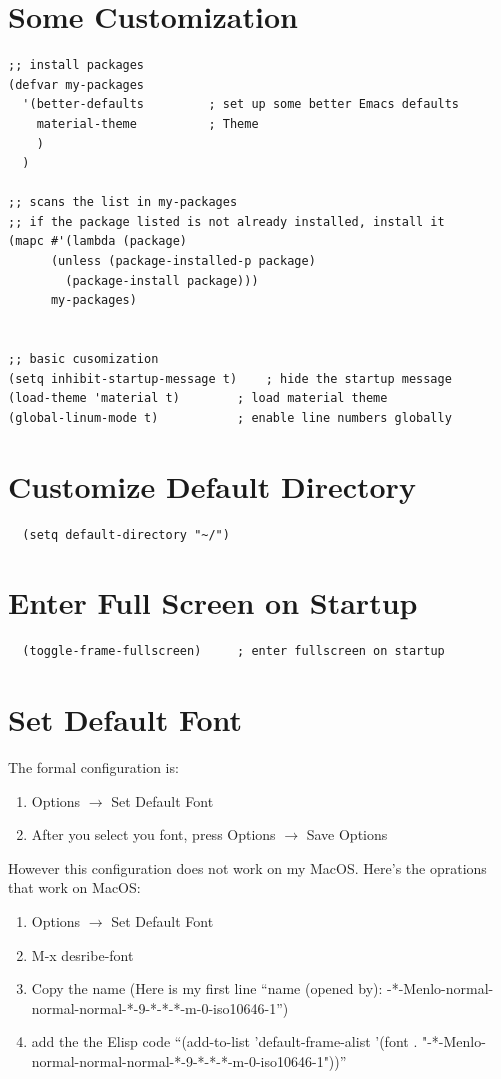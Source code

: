 \section{Some Customization}
\lstset{language=Lisp}
\begin{lstlisting}
;; install packages
(defvar my-packages
  '(better-defaults			; set up some better Emacs defaults
    material-theme			; Theme
    )
  )

;; scans the list in my-packages
;; if the package listed is not already installed, install it
(mapc #'(lambda (package)
	  (unless (package-installed-p package)
	    (package-install package)))
      my-packages)


;; basic cusomization
(setq inhibit-startup-message t)	; hide the startup message
(load-theme 'material t)		; load material theme
(global-linum-mode t)			; enable line numbers globally
\end{lstlisting}


\section{Customize Default Directory}
\lstset{language=Lisp}
\begin{lstlisting}
  (setq default-directory "~/")
\end{lstlisting}


\section{Enter Full Screen on Startup}

\begin{lstlisting}
  (toggle-frame-fullscreen)		; enter fullscreen on startup
\end{lstlisting}


\section{Set Default Font}

The formal configuration is:
\begin{enumerate}
\item Options $\rightarrow$ Set Default Font
\item After you select you font, press Options $\rightarrow$ Save Options
\end{enumerate}


However this configuration does not work on my MacOS.
Here's the oprations that work on MacOS:
\begin{enumerate}
\item Options $\rightarrow$ Set Default Font
\item M-x desribe-font
\item Copy the name (Here is my first line ``name (opened by): -*-Menlo-normal-normal-normal-*-9-*-*-*-m-0-iso10646-1'')
\item add the the Elisp code ``(add-to-list 'default-frame-alist '(font . "-*-Menlo-normal-normal-normal-*-9-*-*-*-m-0-iso10646-1"))''
\end{enumerate}